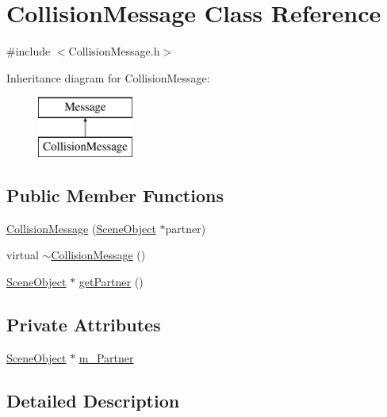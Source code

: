 \hypertarget{class_collision_message}{}\section{Collision\+Message Class Reference}
\label{class_collision_message}


{\ttfamily \#include $<$Collision\+Message.\+h$>$}

Inheritance diagram for Collision\+Message\+:\begin{figure}[H]
\begin{center}
\leavevmode
\includegraphics[height=2.000000cm]{class_collision_message}
\end{center}
\end{figure}
\subsection*{Public Member Functions}
\begin{DoxyCompactItemize}
\item 
\hyperlink{class_collision_message_a36f3e8a87d92faa7f3e57a3c596540b1}{Collision\+Message} (\hyperlink{class_scene_object}{Scene\+Object} $\ast$partner)
\item 
virtual \hyperlink{class_collision_message_a2aa8a6168bfb639726cad05c46f1c987}{$\sim$\+Collision\+Message} ()
\item 
\hyperlink{class_scene_object}{Scene\+Object} $\ast$ \hyperlink{class_collision_message_ad760873a6bff76eebab3e21238a35424}{get\+Partner} ()
\end{DoxyCompactItemize}
\subsection*{Private Attributes}
\begin{DoxyCompactItemize}
\item 
\hyperlink{class_scene_object}{Scene\+Object} $\ast$ \hyperlink{class_collision_message_af8a6bd9fda3bf5a09b7132d13f548073}{m\+\_\+\+Partner}
\end{DoxyCompactItemize}


\subsection{Detailed Description}


